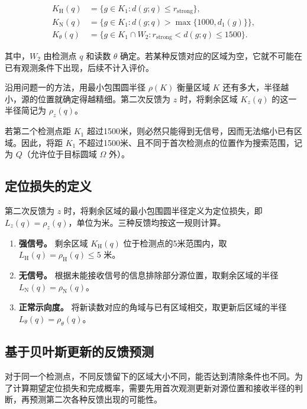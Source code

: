 \begin{equation}
\begin{aligned}
K_{\mathrm H}(q)&=\{g\in K_1:d(g;q)\le r_{\mathrm{strong}}\},\\
K_{\mathrm N}(q)&=\{g\in K_1:d(g;q)>\max\{1000,d_1(g)\}\},\\
K_\theta(q)&=\{g\in K_1\cap W_2:r_{\mathrm{strong}}<d(g;q)\le1500\}.
\end{aligned}
\label{eq:q2-pair-regions}
\end{equation}

其中，\(W_2\) 由检测点 \(q\) 和读数 \(\theta\) 确定。若某种反馈对应的区域为空，它就不可能在已有观测条件下出现，后续不计入评价。

沿用问题一的方法，用最小包围圆半径 \(\rho(K)\) 衡量区域 \(K\) 还有多大，半径越小，源的位置就确定得越精细。第二次反馈为 \(z\) 时，将剩余区域 \(K_z(q)\) 的这一半径简记为 \(\rho_z(q)\)。

若第二个检测点距 \(K_1\) 超过1500米，则必然只能得到无信号，因而无法缩小已有区域。因此，将距 \(K_1\) 不超过1500米、且不同于首次检测点的位置作为搜索范围，记为 \(Q\)（允许位于目标圆域 \(\Omega\) 外）。

\subsection{定位损失的定义}

第二次反馈为 \(z\) 时，将剩余区域的最小包围圆半径定义为定位损失，即 \(L_z(q)=\rho_z(q)\)，单位为米。三种反馈均按这一规则计算。

\begin{enumerate}[label=(\arabic*),leftmargin=2.2em]
  \item \textbf{强信号。} 剩余区域 \(K_{\mathrm H}(q)\) 位于检测点的5米范围内，取 \(L_{\mathrm H}(q)=\rho_{\mathrm H}(q)\le5\) 米。
  \item \textbf{无信号。} 根据未能接收信号的信息排除部分源位置，取剩余区域的半径 \(L_{\mathrm N}(q)=\rho_{\mathrm N}(q)\)。
  \item \textbf{正常示向度。} 将新读数对应的角域与已有区域相交，取更新后区域的半径 \(L_\theta(q)=\rho_\theta(q)\)。
\end{enumerate}

\subsection{基于贝叶斯更新的反馈预测}

对于同一个检测点，不同反馈留下的区域大小不同，能否达到清除条件也不同。为了计算期望定位损失和完成概率，需要先用首次观测更新对源位置和接收半径的判断，再预测第二次各种反馈出现的可能性。

